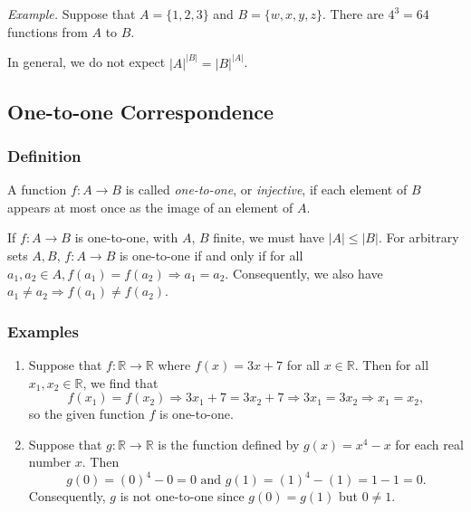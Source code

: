 \documentclass[11pt]{article}
\begin{document}
        \emph{Example.} Suppose that \(A = \{1,2,3\}\) and \(B = \{w,x,y,z\}\). There are \(4^3 = 64\) functions from $A$ to $B$.

        \vspace{1em}

        In general, we do not expect \(|A|^{|B|} = |B|^{|A|}\).

        \subsection{One-to-one Correspondence}

        \subsubsection{Definition}

        A function \(f:A \rightarrow B\) is called \emph{one-to-one}, or \emph{injective}, if each element of $B$ appears at most once as the image of an element of $A$. 
        
        \vspace{1em}

        If \(f: A \rightarrow B\) is one-to-one, with $A$, $B$ finite, we must have \(|A| \leq |B|\). For arbitrary sets \(A,B\), \(f: A \rightarrow B\) is one-to-one if and only if for all \(a_1, a_2 \in A, f(a_1) = f(a_2) \Rightarrow a_1 = a_2.\) Consequently, we also have \(a_1 \neq a_2 \Rightarrow f(a_1) \neq f(a_2).\)

        \subsubsection{Examples}

        \begin{enumerate}
            \item Suppose that \(f: \mathbb{R} \rightarrow \mathbb{R}\) where \(f(x) = 3x + 7\) for all \(x \in \mathbb{R}\). Then for all \(x_1,x_2 \in \mathbb{R}\), we find that \[f(x_1) = f(x_2) \Rightarrow 3x_1 + 7 = 3x_2 + 7 \Rightarrow 3x_1 = 3x_2 \Rightarrow x_1 = x_2,\] so the given function $f$ is one-to-one.
            \item Suppose that \(g: \mathbb{R} \rightarrow \mathbb{R}\) is the function defined by \(g(x) = x^4 - x\) for each real number $x$. Then \[g(0) = (0)^4 - 0 = 0 \text{ and } g(1) = (1)^4 - (1) = 1 - 1 = 0.\] Consequently, $g$ is not one-to-one since \(g(0) = g(1)\) but \(0 \neq 1.\)
        \end{enumerate}
\end{document}
